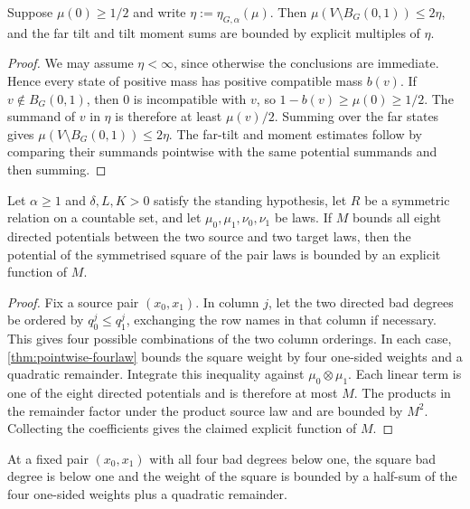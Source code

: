 \begin{lemma}
\label{thm:zero-interface}
\leanok
{}
Suppose $\mu(0)\geq1/2$ and write $\eta:=\eta_{G,\alpha}(\mu)$. Then
$\mu(V\setminus B_G(0,1))\leq2\eta$, and the far tilt and tilt moment sums are bounded by
explicit multiples of $\eta$.
\end{lemma}

\begin{proof}
\leanok
We may assume $\eta<\infty$, since otherwise the conclusions are immediate. Hence every state
of positive mass has positive compatible mass $b(v)$. If $v\notin B_G(0,1)$, then $0$ is
incompatible with $v$, so
$1-b(v)\geq\mu(0)\geq1/2$. The summand of $v$ in $\eta$ is therefore at least
$\mu(v)/2$. Summing over the far states gives
$\mu(V\setminus B_G(0,1))\leq2\eta$. The far-tilt and moment estimates follow by comparing
their summands pointwise with the same potential summands and then summing.
\end{proof}

\begin{theorem}
\label{thm:four-law}
\leanok
{}
Let $\alpha\geq1$ and $\delta,L,K>0$ satisfy the standing hypothesis, let $R$ be a symmetric
relation on a countable set, and let $\mu_0,\mu_1,\nu_0,\nu_1$ be laws. If $M$ bounds all eight
directed potentials between the two source and two target laws, then the potential of the
symmetrised square of the pair laws is bounded by an explicit function of $M$.
\end{theorem}

\begin{proof}
\leanok
{}
Fix a source pair $(x_0,x_1)$. In column $j$, let the two directed bad degrees be ordered by
$q_0^j\leq q_1^j$, exchanging the row names in that column if necessary. This gives four
possible combinations of the two column orderings. In each case,
\cref{thm:pointwise-fourlaw} bounds the square weight by four one-sided weights and a quadratic
remainder. Integrate this inequality against $\mu_0\otimes\mu_1$. Each linear term is one of
the eight directed potentials and is therefore at most $M$. The products in the remainder
factor under the product source law and are bounded by $M^2$. Collecting the coefficients gives
the claimed explicit function of $M$.
\end{proof}

\begin{proposition}
\label{thm:pointwise-fourlaw}
\leanok
At a fixed pair $(x_0,x_1)$ with all four bad degrees below one, the square bad degree is below
one and the weight of the square is bounded by a half-sum of the four one-sided weights plus a
quadratic remainder.
\end{proposition}

